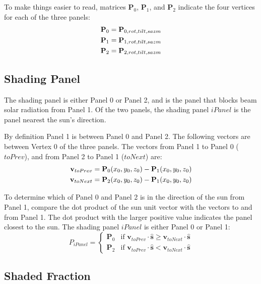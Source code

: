 \documentclass[12pt,letterpaper]{article}
\begin{document}
To make things easier to read, matrices $\mathbf{P}_{0}$, $\mathbf{P}_{1}$, and $\mathbf{P}_{2}$ indicate the four vertices for each of the three panels:
\begin{align}
\mathbf{P}_{0} &= 
\mathbf{P}_{0,rot,tilt,sazm} 
 \notag\\
\mathbf{P}_{1} &= 
\mathbf{P}_{1,rot,tilt,sazm} 
\notag\\
\mathbf{P}_{2} &= 
\mathbf{P}_{2,rot,tilt,sazm} 
\end{align}

\subsection{Shading Panel}

The shading panel is either Panel 0 or Panel 2, and is the panel that blocks beam solar radiation from Panel 1. Of the two panels, the shading panel $\mathit{iPanel}$ is the panel nearest the sun's direction.

By definition Panel 1 is between Panel 0 and Panel 2. The following vectors are between Vertex 0 of the three panels. The vectors from Panel 1 to Panel 0 ($toPrev$), and from Panel 2 to Panel 1 ($toNext$) are:
\begin{align}
\mathbf{v}_{toPrev} = \mathbf{P}_{0}(x_0,y_0,z_0) - \mathbf{P}_{1}(x_0,y_0,z_0)\notag\\
\mathbf{v}_{toNext} = \mathbf{P}_{2}(x_0,y_0,z_0) - \mathbf{P}_{1}(x_0,y_0,z_0)
\end{align}

To determine which of Panel 0 and Panel 2 is in the direction of the sun from Panel 1, compare the dot product of the sun unit vector with the vectors to and from Panel 1. The dot product with the larger positive value indicates the panel closest to the sun. The shading panel $\mathit{iPanel}$ is either Panel 0 or Panel 1:
\begin{equation}
P_{\mathit{iPanel}} = \left\{
\begin{array}{ll}
\mathbf{P}_0 & \text{if $\mathbf{v}_{toPrev} \cdot \mathbf{\hat s} \geq \mathbf{v}_{toNext} \cdot \mathbf{\hat s}$} \\
\mathbf{P}_2 & \text{if $\mathbf{v}_{toPrev} \cdot \mathbf{\hat s} < \mathbf{v}_{toNext} \cdot \mathbf{\hat s}$}
\end{array}
\right.
\end{equation}

\subsection{Shaded Fraction}
\end{document}
